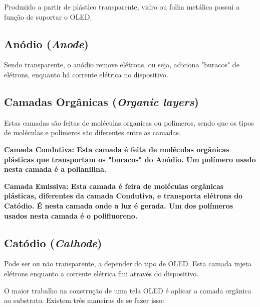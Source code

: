 Produzido a partir de plástico transparente, vidro ou folha metálica possui a função de suportar o OLED.


\subsection{Anódio (\textit{Anode})}
\label{sec:substrato}

Sendo transparente, o anódio remove elétrons, ou seja, adiciona "buracos" de elétrons, enquanto há corrente elétrica no dispositivo.


\subsection{Camadas Orgânicas (\textit{Organic layers})}
\label{sec:substrato}

Estas camadas são feitas de moléculas organicas ou polímeros, sendo que os tipos de moléculas e polímeros são diferentes entre as camadas.

\bf{Camada Condutiva:} Esta camada é feita de moléculas orgânicas plásticas que transportam os "buracos" do Anódio. Um polímero usado nesta camada é a polianilina.

\bf{Camada Emissiva:} Esta camada é feira de moléculas orgânicas plásticas, diferentes da camada Condutiva, e transporta elétrons do Catódio. É nesta camada onde a luz é gerada. Um dos polímeros usados nesta camada é o polifluoreno. 


\subsection{Catódio (\textit{Cathode})}
\label{sec:substrato}

Pode ser ou não transparente, a depender do tipo de OLED. Esta camada injeta elétrons enquanto a corrente elétrica flui através do dispositivo. 

O maior trabalho na construção de uma tela OLED é aplicar a camada orgânica ao substrato. Existem três maneiras de se fazer isso:


